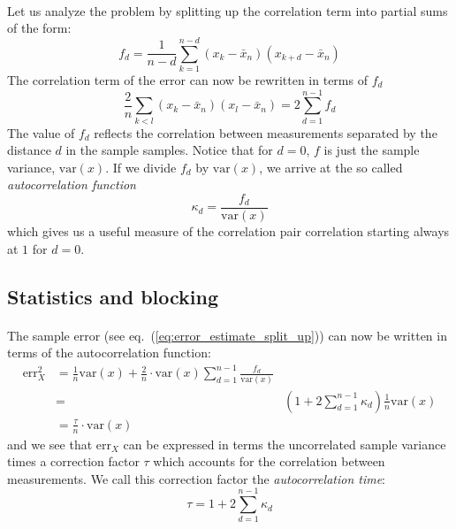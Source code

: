 \documentclass[%
twoside,                 %
final,                   %
10pt]{article}
\begin{document}
\paragraph{}
Let us analyze the problem by splitting up the correlation term into
partial sums of the form:
\[
f_d = \frac{1}{n-d}\sum_{k=1}^{n-d}(x_k - \bar x_n)(x_{k+d} - \bar x_n)
\]
The correlation term of the error can now be rewritten in terms of
$f_d$
\[
\frac{2}{n}\sum_{k<l} (x_k - \bar x_n)(x_l - \bar x_n) =
2\sum_{d=1}^{n-1} f_d
\]
The value of $f_d$ reflects the correlation between measurements
separated by the distance $d$ in the sample samples.  Notice that for
$d=0$, $f$ is just the sample variance, $\mathrm{var}(x)$. If we divide $f_d$
by $\mathrm{var}(x)$, we arrive at the so called \emph{autocorrelation function}
\[
\kappa_d = \frac{f_d}{\mathrm{var}(x)}
\]
which gives us a useful measure of the correlation pair correlation
starting always at $1$ for $d=0$.




\subsection*{Statistics and blocking}

\paragraph{}
The sample error (see eq.~(\ref{eq:error_estimate_split_up})) can now be
written in terms of the autocorrelation function:
\begin{align}
\mathrm{err}_X^2 &=
\frac{1}{n}\mathrm{var}(x)+\frac{2}{n}\cdot\mathrm{var}(x)\sum_{d=1}^{n-1}
\frac{f_d}{\mathrm{var}(x)}\nonumber\\ &=&
\left(1+2\sum_{d=1}^{n-1}\kappa_d\right)\frac{1}{n}\mathrm{var}(x)\nonumber\\
&=\frac{\tau}{n}\cdot\mathrm{var}(x)
\label{eq:error_estimate_corr_time}
\end{align}
and we see that $\mathrm{err}_X$ can be expressed in terms the
uncorrelated sample variance times a correction factor $\tau$ which
accounts for the correlation between measurements. We call this
correction factor the \emph{autocorrelation time}:
\begin{equation}
\tau = 1+2\sum_{d=1}^{n-1}\kappa_d
\label{eq:autocorrelation_time}
\end{equation}
\end{document}
